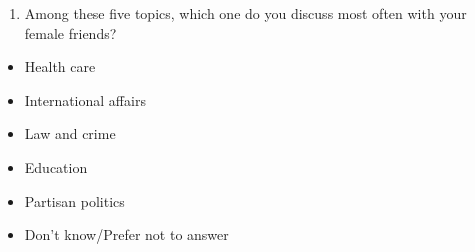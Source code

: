 \documentclass[
  letterpaper,
  DIV=11,
  numbers=noendperiod]{scrreprt}
\providecommand{\tightlist}{%
  \setlength{\itemsep}{0pt}\setlength{\parskip}{0pt}}\usepackage{longtable,booktabs,array}
\begin{document}
\begin{enumerate}
\def\labelenumi{\arabic{enumi}.}
\setcounter{enumi}{11}
\tightlist
\item
  Among these five topics, which one do you discuss most often with your
  female friends?
\end{enumerate}

\begin{itemize}
\tightlist
\item
  Health care
\item
  International affairs
\item
  Law and crime
\item
  Education
\item
  Partisan politics
\item
  Don't know/Prefer not to answer
\end{itemize}
\end{document}
